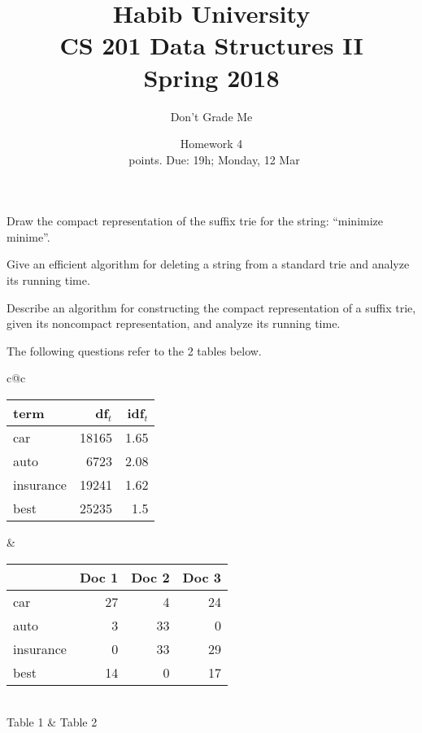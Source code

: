 \documentclass[addpoints]{exam}
\title{Habib University\\CS 201 Data Structures II\\Spring 2018}
\author{Don't Grade Me}  %
\date{Homework 4\\\numpoints\ points. Due: 19h; Monday, 12 Mar}
\begin{document}
\maketitle

\begin{questions}

  \question[10] %
  Draw the compact representation of the suffix trie for the string: ``minimize minime''.

  \begin{solution}
  \end{solution}

  \question[10]%
  Give an efficient algorithm for deleting a string from a standard trie and
  analyze its running time.

  \begin{solution}
  \end{solution}
  
  \question[10]  %
  Describe an algorithm for constructing the compact representation of a suffix trie, given its noncompact representation, and analyze its running time.

  \begin{solution}
  \end{solution}

  \begin{EnvUplevel}
    The following questions refer to the 2 tables below.

    \begin{tabular}{c@{\hspace{50pt}}c}
      \begin{tabular}{|l|r|r|}
        \hline
        term & df$_t$ & idf$_t$\\\hline
        car & 18165 & 1.65\\
        auto & 6723 & 2.08\\
        insurance & 19241 & 1.62\\
        best & 25235 & 1.5\\
        \hline
      \end{tabular}
             &
               \begin{tabular}{|l|r|r|r|}
                 \hline
                 & Doc 1 & Doc 2 & Doc 3\\\hline
                 car & 27 & 4 & 24\\
                 auto & 3 & 33 & 0\\
                 insurance & 0 & 33 & 29\\
                 best & 14 & 0 & 17 \\\hline
               \end{tabular}\\
      Table 1 & Table 2
    \end{tabular}
  \end{EnvUplevel}


\end{questions}
\end{document}
